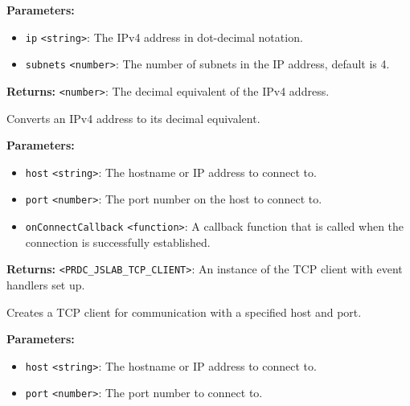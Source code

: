\documentclass[12pt,a4paper]{article}
\begin{document}
\vspace{5mm}
\noindent {}


\noindent \textbf{Parameters:}
\begin{itemize}
  \item \texttt{ip} \texttt{<string>}: The IPv4 address in dot-decimal notation.
  \item \texttt{subnets} \texttt{<number>}: The number of subnets in the IP address, default is 4.
\end{itemize}

\noindent \textbf{Returns:} \texttt{<number>}: The decimal equivalent of the IPv4 address.

\noindent Converts an IPv4 address to its decimal equivalent.

\vspace{5mm}
\noindent {}


\noindent \textbf{Parameters:}
\begin{itemize}
  \item \texttt{host} \texttt{<string>}: The hostname or IP address to connect to.
  \item \texttt{port} \texttt{<number>}: The port number on the host to connect to.
  \item \texttt{onConnectCallback} \texttt{<function>}: A callback function that is called when the connection is successfully established.
\end{itemize}

\noindent \textbf{Returns:} \texttt{<PRDC\_JSLAB\_TCP\_CLIENT>}: An instance of the TCP client with event handlers set up.

\noindent Creates a TCP client for communication with a specified host and port.

\vspace{5mm}
\noindent {}


\noindent \textbf{Parameters:}
\begin{itemize}
  \item \texttt{host} \texttt{<string>}: The hostname or IP address to connect to.
  \item \texttt{port} \texttt{<number>}: The port number to connect to.
\end{itemize}
\end{document}
